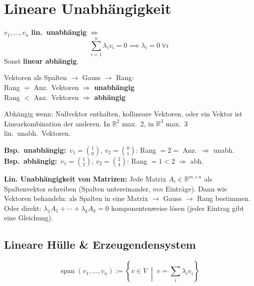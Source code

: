 \documentclass[10pt,a4paper,twocolumn]{article}
\newcommand{\seccol}{black}
\newcommand{\setseccol}[1]{\renewcommand{\seccol}{#1}}
\newcommand{\detail}[1]{{\small\color{detail}#1}}
\begin{document}
	\setseccol{c2}
	\section{Lineare Unabhängigkeit}
	
	\begin{tcolorbox}[defbox, title={Definition}]
		$v_1,\ldots,v_n$ \textbf{lin.\ unabhängig} $\iff$
		$$\sum_{i=1}^n\lambda_i v_i = 0 \implies \lambda_i=0\ \forall i$$
		Sonst \textbf{linear abhängig}.
	\end{tcolorbox}
	
	\begin{tcolorbox}[recbox, title={Rezept via Gauss}]
		Vektoren als Spalten $\to$ Gauss $\to$ Rang:\\
		Rang $=$ Anz.\ Vektoren $\Rightarrow$ \textbf{unabhängig}\\
		Rang $<$ Anz.\ Vektoren $\Rightarrow$ \textbf{abhängig}
	\end{tcolorbox}
	
	\detail{Abhängig wenn: Nullvektor enthalten, kollineare Vektoren, oder ein Vektor ist Linearkombination der anderen. In $\mathbb{R}^2$ max.\ 2, in $\mathbb{R}^3$ max.\ 3 lin.\ unabh.\ Vektoren.}
	
	\begin{tcolorbox}[detbox]
		\textbf{Bsp.\ unabhängig:}\ $v_1=\!\binom{1}{0}$, $v_2=\!\binom{0}{1}$: Rang $=2=$ Anz.\ $\Rightarrow$ unabh.\\
		\textbf{Bsp.\ abhängig:}\ $v_1=\!\binom{1}{2}$, $v_2=\!\binom{2}{4}$: Rang $=1<2$ $\Rightarrow$ abh.
	\end{tcolorbox}
	
	\begin{tcolorbox}[detbox]
		\textbf{Lin. Unabhängigkeit von Matrizen:} Jede Matrix $A_i \in \mathbb{R}^{m\times n}$ als Spaltenvektor schreiben (Spalten untereinander, $mn$ Einträge). Dann wie Vektoren behandeln: als Spalten in eine Matrix $\to$ Gauss $\to$ Rang bestimmen.\\
		Oder direkt: $\lambda_1 A_1 + \cdots + \lambda_k A_k = 0$ komponentenweise lösen (jeder Eintrag gibt eine Gleichung).
	\end{tcolorbox}
	
	\subsection{Lineare Hülle \& Erzeugendensystem}
	
	$$\operatorname{span}(v_1,\ldots,v_n):=\!\left\{v\in V\;\middle|\;v=\sum_i\lambda_i v_i\right\}$$
	
\end{document}
